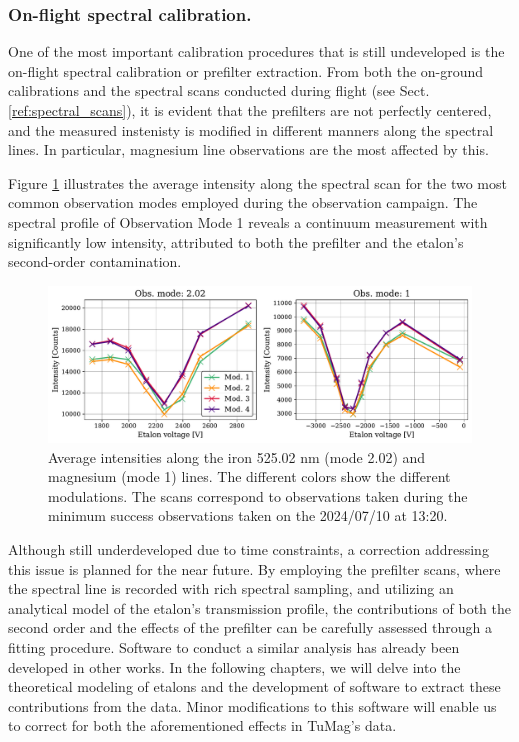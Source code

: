 \subsubsection{\label{sect:pipeline_prefilter_scans_fit}On-flight spectral calibration.}

One of the most important calibration procedures that is still undeveloped is the on-flight spectral calibration or prefilter extraction. From both the on-ground calibrations and the spectral scans conducted during flight (see Sect. \ref{ref:spectral_scans}), it is evident that the prefilters are not perfectly centered, and the measured instenisty is modified in different manners along the spectral lines. In particular, magnesium line observations are the most affected by this.

Figure \ref{fig_pipeline: spectral_scans} illustrates the average intensity along the spectral scan for the two most common observation modes employed during the observation campaign. The spectral profile of Observation Mode 1 reveals a continuum measurement with significantly low intensity, attributed to both the prefilter and the etalon's second-order contamination.

\begin{figure}[t]
  \includegraphics[width=\textwidth]{figures/Pipeline/Spectral_scans_ecample.pdf}
  \caption[Spectral profile of observing modes 1 and 2.02.]{
    Average intensities along the iron 525.02 nm (mode 2.02) and magnesium (mode 1) lines. The different colors show the different modulations. The scans correspond to observations taken during the minimum success observations taken on the 2024/07/10 at 13:20.}
    \label{fig_pipeline: spectral_scans}
\end{figure}

Although still underdeveloped due to time constraints, a correction addressing this issue is planned for the near future. By employing the prefilter scans, where the spectral line is recorded with rich spectral sampling, and utilizing an analytical model of the etalon's transmission profile, the contributions of both the second order and the effects of the prefilter can be carefully assessed through a fitting procedure. Software to conduct a similar analysis has already been developed in other works. In the following chapters, we will delve into the theoretical modeling of etalons and the development of software to extract these contributions from the data. Minor modifications to this software will enable us to correct for both the aforementioned effects in TuMag's data.

